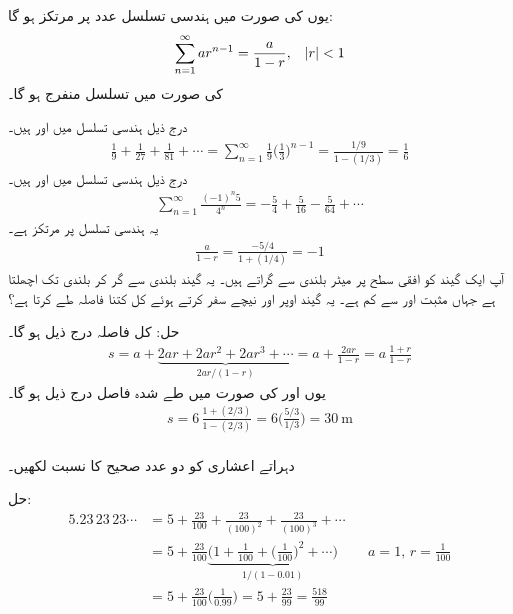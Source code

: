 یوں  کی صورت میں ہندسی تسلسل  عدد  پر مرتکز ہو گا:
\begin{align}
\sum_{n=1}^{\infty}ar^{n-1}=\frac{a}{1-r},\quad \abs{r}<1
\end{align}
 کی صورت میں تسلسل منفرج ہو گا۔

درج ذیل ہندسی تسلسل میں  اور  ہیں۔
\begin{align*}
\frac{1}{9}+\frac{1}{27}+\frac{1}{81}+\cdots=\sum_{n=1}^{\infty}\frac{1}{9}\big(\frac{1}{3}\big)^{n-1}=\frac{1/9}{1-(1/3)}=\frac{1}{6}
\end{align*}
درج ذیل ہندسی تسلسل میں  اور  ہیں۔
\begin{align*}
\sum_{n=1}^{\infty}\frac{(-1)^n5}{4^n}=-\frac{5}{4}+\frac{5}{16}-\frac{5}{64}+\cdots
\end{align*}
یہ ہندسی تسلسل  پر مرتکز ہے۔
\begin{align*}
\frac{a}{1-r}=\frac{-5/4}{1+(1/4)}=-1
\end{align*}
آپ ایک گیند کو افقی سطح پر  میٹر بلندی سے گراتے ہیں۔ یہ گیند  بلندی سے گر کر  بلندی تک اچھلتا  ہے جہاں  مثبت اور  سے کم ہے۔ یہ گیند اوپر اور نیچے سفر کرتے ہوئے کل کتنا فاصلہ طے کرتا ہے؟

حل:\quad
کل فاصلہ درج ذیل ہو گا۔
\begin{align*}
s=a+\underbrace{2ar+2ar^2+2ar^3+\cdots}_{2ar/(1-r)}=a+\frac{2ar}{1-r}=a\,\frac{1+r}{1-r}
\end{align*}
یوں  اور  کی صورت میں طے شدہ فاصل درج ذیل ہو گا۔
\begin{align*}
s=6\,\frac{1+(2/3)}{1-(2/3)}=6\big(\frac{5/3}{1/3}\big)=\SI{30}{\meter}
\end{align*} 
\\
دہراتے اعشاری  کو دو عدد صحیح کا نسبت لکھیں۔

حل:\quad
\begin{align*}
5.23\,23\,23\cdots&=5+\frac{23}{100}+\frac{23}{(100)^2}+\frac{23}{(100)^3}+\cdots\\
&=5+\frac{23}{100}\underbrace{\big(1+\frac{1}{100}+\big(\frac{1}{100}\big)^2+\cdots\big)}_{1/(1-0.01)}&&a=1,\, r=\tfrac{1}{100}\\
&=5+\frac{23}{100}\big(\frac{1}{0.99}\big)=5+\frac{23}{99}=\frac{518}{99}
\end{align*}

